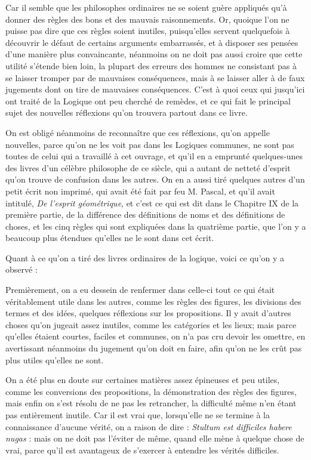 Car il semble que les philosophes ordinaires ne se soient guère appliqués qu'à donner des règles des bons et des mauvais raisonnements. Or, quoique l'on ne puisse pas dire que ces règles soient inutiles, puisqu'elles servent quelquefois à découvrir le défaut de certains arguments embarrassés, et à disposer ses pensées d'une manière plus convaincante, néanmoins on ne doit pas aussi croire que cette utilité s'étende bien loin, la plupart des erreurs des hommes ne consistant pas à se laisser tromper par de mauvaises conséquences, mais à se laisser aller à de faux jugements dont on tire de mauvaises conséquences. C'est à quoi ceux qui jusqu'ici ont traité de la Logique ont peu cherché de remèdes, et ce qui fait le principal sujet des nouvelles réflexions qu'on trouvera partout dans ce livre.

On est obligé néanmoins de reconnaître que ces réflexions, qu'on appelle nouvelles, parce qu'on ne les voit pas dans les Logiques communes, ne sont pas toutes de celui qui a travaillé à cet ouvrage, et qu'il en a emprunté quelques-unes des livres d'un célèbre philosophe de ce siècle, qui a autant de netteté d'esprit qu'on trouve de confusion dans les autres. On en a aussi tiré quelques autres d'un petit écrit non imprimé, qui avait été fait par feu M. Pascal, et qu'il avait intitulé, \emph{De l'esprit géométrique}, et c'est ce qui est dit dans le Chapitre IX de la première partie, de la différence des définitions de noms et des définitions de choses, et les cinq règles qui sont expliquées dans la quatrième partie, que l'on y a beaucoup plus étendues qu'elles ne le sont dans cet écrit.

Quant à ce qu'on a tiré des livres ordinaires de la logique, voici ce qu'on y a observé :

Premièrement, on a eu dessein de renfermer dans celle-ci tout ce qui était véritablement utile dans les autres, comme les règles des figures, les divisions des termes et des idées, quelques réflexions sur les propositions. Il y avait d'autres choses qu'on jugeait assez inutiles, comme les catégories et les lieux; mais parce qu'elles étaient courtes, faciles et communes, on n'a pas cru devoir les omettre, en avertissant néanmoins du jugement qu'on doit en faire, afin qu'on ne les crût pas plus utiles qu'elles ne sont.

On a été plus en doute sur certaines matières assez épineuses et peu utiles, comme les conversions des propositions, la démonstration des règles des figures, mais enfin on s'est résolu de ne pas les retrancher, la difficulté même n'en étant pas entièrement inutile. Car il est vrai que, lorsqu'elle ne se termine à la connaissance d'aucune vérité, on a raison de dire : \emph{Stultum est difficiles habere nugas} : mais on ne doit pas l'éviter de même, quand elle mène à quelque chose de vrai, parce qu'il est avantageux de s'exercer à entendre les vérités difficiles.

